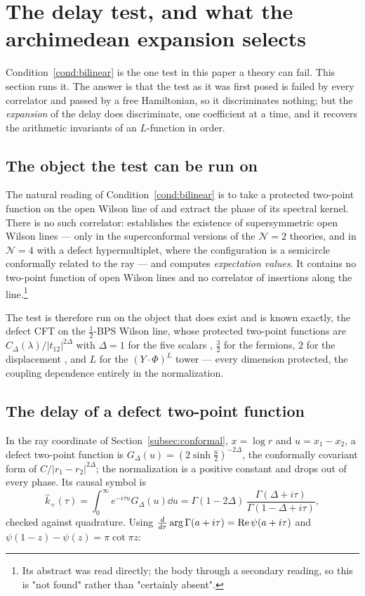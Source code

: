 \section{The delay test, and what the archimedean expansion selects}
\label{sec:delay}

Condition~\ref{cond:bilinear} is the one test in this paper a theory can fail.
This section runs it. The answer is that the test as it was first posed is failed
by every correlator and passed by a free Hamiltonian, so it discriminates nothing;
but the \emph{expansion} of the delay does discriminate, one coefficient at a
time, and it recovers the arithmetic invariants of an $L$-function in order.

\subsection{The object the test can be run on}

The natural reading of Condition~\ref{cond:bilinear} is to take a protected
two-point function on the open Wilson line of \cite{OWL} and extract the phase of
its spectral kernel. There is no such correlator: \cite{OWL} establishes the
existence of supersymmetric open Wilson lines --- only in the superconformal
versions of the $\mathcal N=2$ theories, and in $\mathcal N=4$ with a defect
hypermultiplet, where the configuration is a semicircle conformally related to the
ray --- and computes \emph{expectation values}. It contains no two-point function
of open Wilson lines and no correlator of insertions along the line.\footnote{Its
abstract was read directly; the body through a secondary reading, so this is
"not found" rather than "certainly absent".}

The test is therefore run on the object that does exist and is known exactly, the
defect CFT on the $\frac12$-BPS Wilson line, whose protected two-point functions
are $C_\Delta(\lambda)/|t_{12}|^{2\Delta}$ with $\Delta=1$ for the five scalars
\cite{GRT}, $\frac32$ for the fermions, $2$ for the displacement
\cite{CHMS}, and $L$ for the $(Y\!\cdot\!\Phi)^L$ tower \cite{GiombiKomatsu} ---
every dimension protected, the coupling dependence entirely in the normalization.

\subsection{The delay of a defect two-point function}

In the ray coordinate of Section~\ref{subsec:conformal}, $x=\log r$ and
$u=x_1-x_2$, a defect two-point function is
$G_\Delta(u)=(2\sinh\frac u2)^{-2\Delta}$, the conformally covariant form of
$C/|r_1-r_2|^{2\Delta}$; the normalization is a positive constant and drops out of
every phase. Its causal symbol is
\begin{equation}\label{eq:defectsymbol}
 \widehat k_+(\tau)=\int_0^\infty e^{-i\tau u}G_\Delta(u)\dd u
 =\Gamma(1-2\Delta)\,\frac{\Gamma(\Delta+i\tau)}{\Gamma(1-\Delta+i\tau)} ,
\end{equation}
checked against quadrature. Using
$\frac{d}{d\tau}\arg\Gamma(a+i\tau)=\operatorname{Re}\psi(a+i\tau)$ and
$\psi(1-z)-\psi(z)=\pi\cot\pi z$:

